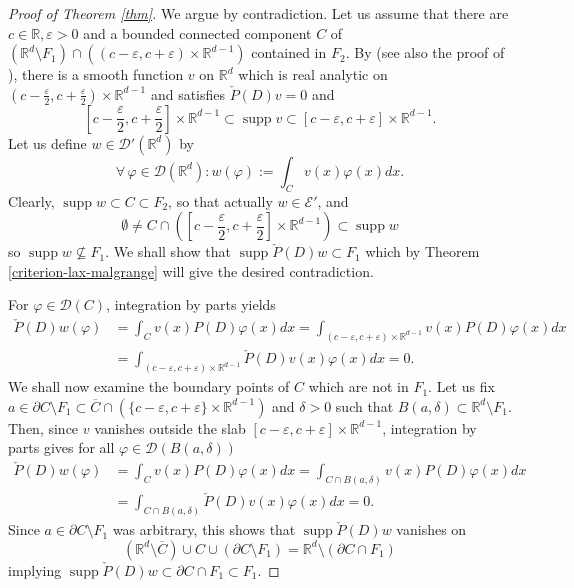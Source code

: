 \documentclass[10pt,leqno]{amsart}
\theoremstyle{definition}
\newcommand{\R}{\mathbb R}
\newcommand{\supp}{\operatorname{supp}}
\let\epsilon\varepsilon
\let\phi\varphi
\begin{document}
\begin{proof}[Proof of Theorem \ref{thm}]
	We argue by contradiction. Let us assume that there are $c\in\R, \epsilon>0$ and a bounded connected component $C$ of $(\R^d\setminus F_1)\cap (\left(c-\epsilon,c+\epsilon\right)\times\R^{d-1})$ contained in $F_2$. By \cite[Theorem 5]{Kalmes2021} (see also the proof of \cite[Theorem 2]{Kalmes2021}), there is a smooth function $v$ on $\R^d$ which is real analytic on $(c-\frac{\epsilon}{2},c+\frac{\epsilon}{2})\times\R^{d-1}$ and satisfies $\check P(D)v=0$ and
	$$\left[c-\frac{\epsilon}{2},c+\frac{\epsilon}{2}\right]\times\R^{d-1}\subset\supp v\subset\left[c-\epsilon,c+\epsilon\right]\times\R^{d-1}.$$
	Let us define $w\in\mathscr{D}'(\R^d)$ by
	$$\forall\,\phi\in\mathscr{D}(\R^d)\colon w(\phi):=\int_C v(x)\phi(x)dx.$$
	Clearly, $\supp w\subset C\subset F_2$, so that actually $w\in\mathscr{E}'$, and 
	$$\emptyset\neq C\cap\left(\left[c-\frac{\epsilon}{2},c+\frac{\epsilon}{2}\right]\times\R^{d-1}\right)\subset\supp w$$
	so $\supp w\nsubseteq F_1$. We shall show that $\supp \check P(D)w\subset F_1$ which by Theorem \ref{criterion-lax-malgrange} will give the desired contradiction. 
	
	For $\phi\in \mathscr{D}(C)$, integration by parts yields
	\begin{align*}
		\check P(D)w(\phi)&=\int_C v(x)P(D)\phi(x)dx=\int_{(c-\varepsilon,c+\varepsilon)\times\R^{d-1}}v(x)P(D)\phi(x)dx\\
		&=\int_{(c-\varepsilon,c+\varepsilon)\times\R^{d-1}}\check{P}(D)v(x)\phi(x)dx=0.
	\end{align*}
	We shall now examine the boundary points of $C$ which are not in $F_1$. Let us fix $a\in \partial{C}\setminus F_1\subset \overline C\cap(\{c-\epsilon,c+\epsilon\}\times\R^{d-1})$ and $\delta>0$ such that $B(a,\delta)\subset\R^d\setminus F_1$. Then, since $v$ vanishes outside the slab $[c-\epsilon,c+\epsilon]\times\R^{d-1}$, integration by parts gives for all $\phi\in \mathscr{D}(B(a,\delta))$
	\begin{align*}
		\check P(D)w(\phi)&=\int_C v(x)P(D)\phi(x) dx=\int_{C\cap B(a,\delta)} v(x)P(D)\phi(x)dx\\
		&=\int_{C\cap B(a,\delta)}\check P(D)v(x)\phi(x)dx=0. 
	\end{align*}
	Since $a\in\partial C\setminus F_1$ was arbitrary, this shows that $\supp \check P(D)w$ vanishes on 
	$$(\R^d\setminus \overline{C})\cup C\cup (\partial C\setminus F_1)=\R^d\setminus(\partial C\cap F_1)$$
	implying $\supp \check P(D)w\subset\partial C\cap F_1\subset F_1$. 
\end{proof}
\end{document}

